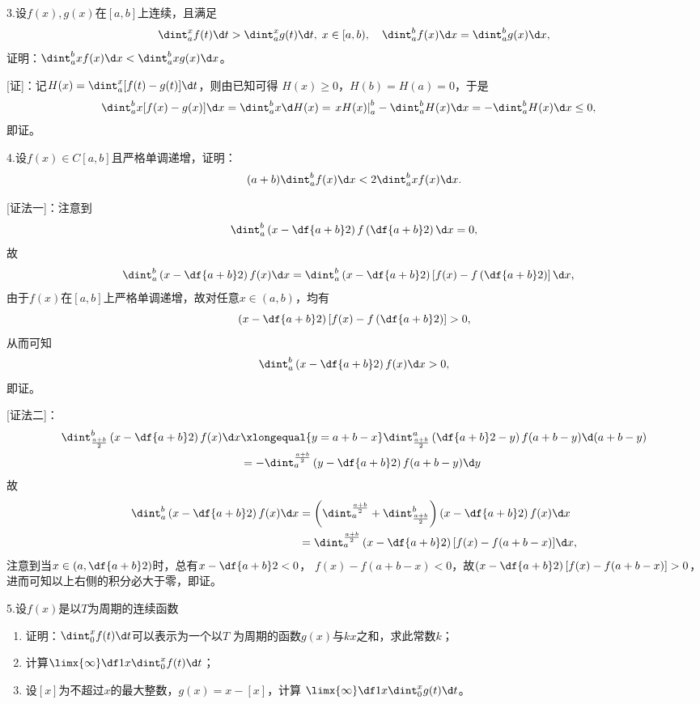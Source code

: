 \bs

3.设$f(x),g(x)$在$[a,b]$上连续，且满足
$$\dint_a^xf(t)\d t>\dint_a^xg(t)\d t,\;x\in[a,b),
\quad \dint_a^bf(x)\d x=\dint_a^bg(x)\d x,$$
证明：$\dint_a^bxf(x)\d x<\dint_a^bxg(x)\d x$。

[证]：记$H(x)=\dint_a^x[f(t)-g(t)]\d t$，则由已知可得
$H(x)\geq 0$，$H(b)=H(a)=0$，于是
\begin{align*}
	\dint_a^bx[f(x)-g(x)]\d x
	&=\dint_a^bx\d H(x)
	=\left.xH(x)\right|_a^b-\dint_a^bH(x)\d x
	=-\dint_a^bH(x)\d x\leq 0,
\end{align*}
即证。\fin

4.设$f(x)\in C[a,b]$且严格单调递增，证明：
$$(a+b)\dint_a^bf(x)\d x<2\dint_a^bxf(x)\d x.$$

[证法一]：注意到
$$\dint_a^b\left(x-\df{a+b}2\right)f\left(\df{a+b}2\right)\d x=0,$$
故
\begin{align*}
	\dint_a^b\left(x-\df{a+b}2\right)f(x)\d x
	&=\dint_a^b\left(x-\df{a+b}2\right)\left[f(x)
	-f\left(\df{a+b}2\right)\right]\d x,
\end{align*}
由于$f(x)$在$[a,b]$上严格单调递增，故对任意$x\in(a,b)$，均有
$$\left(x-\df{a+b}2\right)\left[f(x)
-f\left(\df{a+b}2\right)\right]>0,$$
从而可知
$$\dint_a^b\left(x-\df{a+b}2\right)f(x)\d x>0,$$
即证。\fin

[证法二]：
\begin{align*}
	\dint_{\frac{a+b}2}^b\left(x-\df{a+b}2\right)f(x)\d x
	&\xlongequal{y=a+b-x}\dint_{\frac{a+b}2}^a
	\left(\df{a+b}2-y\right)f(a+b-y)\d (a+b-y)\\
	&=-\dint_a^{\frac{a+b}2}
	\left(y-\df{a+b}2\right)f(a+b-y)\d y
\end{align*}
故
\begin{align*}
	\dint_a^b\left(x-\df{a+b}2\right)f(x)\d x
	&=\left(\dint_a^{\frac{a+b}2}+\dint_{\frac{a+b}2}^b\right)
	\left(x-\df{a+b}2\right)f(x)\d x\\
	&=\dint_a^{\frac{a+b}2}\left(x-\df{a+b}2\right)
	[f(x)-f(a+b-x)]\d x,
\end{align*}
注意到当$x\in\left(a,\df{a+b}2\right)$时，总有$x-\df{a+b}2<0$，
$f(x)-f(a+b-x)<0$，故$\left(x-\df{a+b}2\right)[f(x)-f(a+b-x)]>0$，
进而可知以上右侧的积分必大于零，即证。\fin

5.设$f(x)$是以$T$为周期的连续函数
  \begin{enumerate}[(1)]
    \item 证明：$\dint_0^xf(t)\d t$可以表示为一个以$T$
    为周期的函数$g(x)$与$kx$之和，求此常数$k$；
    \item 计算$\limx{\infty}\df1x\dint_0^xf(t)\d t$；
    \item 设$[x]$为不超过$x$的最大整数，$g(x)=x-[x]$，计算
    $\limx{\infty}\df1x\dint_0^xg(t)\d t$。
  \end{enumerate}

